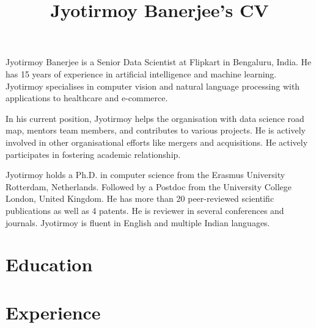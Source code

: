 \documentclass[a4paper,online]{adcv}
\title{Jyotirmoy Banerjee’s CV}
\begin{document}
Jyotirmoy Banerjee is a Senior Data Scientist at Flipkart in Bengaluru, India. He has 15 years of experience in artificial intelligence and machine learning.
Jyotirmoy specialises in computer vision and natural language processing with applications to healthcare and e-commerce.

In his current position, Jyotirmoy helps the organisation with data science road map, mentors team members, and contributes to various projects. 
He is actively involved in other organisational efforts like mergers and acquisitions. He actively participates in fostering academic relationship.

Jyotirmoy holds a Ph.D. in computer science from the Erasmus University Rotterdam, Netherlands. Followed by a Postdoc from the University College London, United Kingdom. He has more than 20 peer-reviewed scientific publications as well as 4 patents. He is reviewer in several conferences and journals.
Jyotirmoy is fluent in English and multiple Indian languages.

\section{Education}

\begin{adcvtabletwo}
\end{adcvtabletwo}


\section{Experience}
\end{document}
